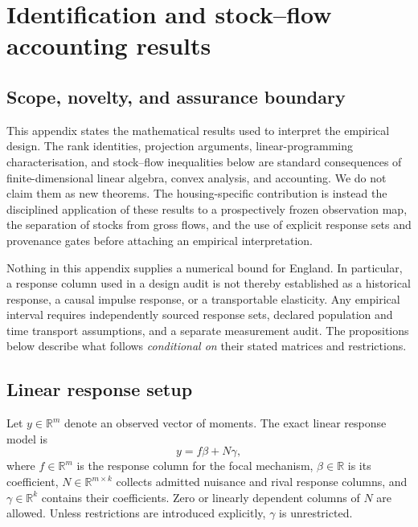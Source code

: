 \section{Identification and stock--flow accounting results}
\label{app:identification-theory}

\subsection{Scope, novelty, and assurance boundary}
\label{app:scope}

This appendix states the mathematical results used to interpret the empirical
design. The rank identities, projection arguments, linear-programming
characterisation, and stock--flow inequalities below are standard consequences
of finite-dimensional linear algebra, convex analysis, and accounting. We do
not claim them as new theorems. The housing-specific contribution is instead
the disciplined application of these results to a prospectively frozen observation
map, the separation of stocks from gross flows, and the use of explicit
response sets and provenance gates before attaching an empirical
interpretation.

Nothing in this appendix supplies a numerical bound for England. In
particular, a response column used in a design audit is not thereby established
as a historical response, a causal impulse response, or a transportable
elasticity. Any empirical interval requires independently sourced response
sets, declared population and time transport assumptions, and a separate
measurement audit. The propositions below describe what follows
\emph{conditional on} their stated matrices and restrictions.

\subsection{Linear response setup}
\label{app:linear-setup}

Let \(y\in\mathbb R^m\) denote an observed vector of moments. The exact linear
response model is
\begin{equation}
  y=f\beta+N\gamma,
  \label{eq:linear-response}
\end{equation}
where \(f\in\mathbb R^m\) is the response column for the focal mechanism,
\(\beta\in\mathbb R\) is its coefficient,
\(N\in\mathbb R^{m\times k}\) collects admitted nuisance and rival response
columns, and \(\gamma\in\mathbb R^k\) contains their coefficients. Zero or
linearly dependent columns of \(N\) are allowed. Unless restrictions are
introduced explicitly, \(\gamma\) is unrestricted.

